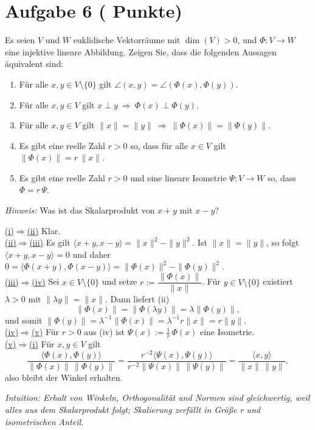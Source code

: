 \documentclass[11pt, a4paper]{article}
\newcommand{\aufgabe}[2]{%
  \section*{\Large\bfseries Aufgabe #1%
  \if\relax\detokenize{#2}\relax\else \hfill\normalfont\normalsize(#2 Punkte)\fi}%
  \vspace{-1.5ex}
}
\begin{document}
\aufgabe{6}{}
Es seien $V$ und $W$ euklidische Vektorräume mit $\dim(V)>0$, und $\Phi:V\to W$ eine injektive lineare Abbildung. Zeigen Sie, dass die folgenden Aussagen äquivalent sind:
\begin{enumerate}
  \item Für alle $x,y\in V\setminus\{0\}$ gilt $\angle(x,y)=\angle(\Phi(x),\Phi(y))$.
  \item Für alle $x,y\in V$ gilt $x\perp y\ \Rightarrow\ \Phi(x)\perp \Phi(y)$.
  \item Für alle $x,y\in V$ gilt $\|x\|=\|y\|\ \Rightarrow\ \|\Phi(x)\|=\|\Phi(y)\|$.
  \item Es gibt eine reelle Zahl $r>0$ so, dass für alle $x\in V$ gilt $\|\Phi(x)\|=r\,\|x\|$.
  \item Es gibt eine reelle Zahl $r>0$ und eine lineare Isometrie $\Psi:V\to W$ so, dass $\Phi=r\,\Psi$.
\end{enumerate}
\emph{Hinweis:} Was ist das Skalarprodukt von $x+y$ mit $x-y$?
\begin{framed}


\underline{(i)$\Rightarrow$(ii)} Klar. \\
\underline{(ii)$\Rightarrow$(iii)} Es gilt $\langle x+y,x-y\rangle=\|x\|^2-\|y\|^2$.
Ist $\|x\|=\|y\|$, so folgt $\langle x+y,x-y\rangle=0$ und daher
$0=\langle\Phi(x+y),\Phi(x-y)\rangle=\|\Phi(x)\|^2-\|\Phi(y)\|^2$. \\
\underline{(iii)$\Rightarrow$(iv)} Sei $x\in V\setminus\{0\}$ und setze
$r:=\dfrac{\|\Phi(x)\|}{\|x\|}$. Für $y\in V\setminus\{0\}$ existiert
$\lambda>0$ mit $\|\lambda y\|=\|x\|$. Dann liefert (ii)
\[
  \|\Phi(x)\|=\|\Phi(\lambda y)\|=\lambda\|\Phi(y)\|,
\]
und somit $\|\Phi(y)\|=\lambda^{-1}\|\Phi(x)\|=\lambda^{-1}r\|x\|
=r\|y\|$. \\
\underline{(iv)$\Rightarrow$(v)} Für $r>0$ aus (iv) ist
$\Psi(x):=\tfrac1r\,\Phi(x)$ eine Isometrie. \\
\underline{(v)$\Rightarrow$(i)} Für $x,y\in V$ gilt
\[
\frac{\langle \Phi(x),\Phi(y)\rangle}{\|\Phi(x)\|\,\|\Phi(y)\|}
=\frac{r^{-2}\langle \Psi(x),\Psi(y)\rangle}{r^{-2}\|\Psi(x)\|\,\|\Psi(y)\|}
=\frac{\langle x,y\rangle}{\|x\|\,\|y\|},
\]
also bleibt der Winkel erhalten.

\medskip\noindent\textit{Intuition: Erhalt von Winkeln, Orthogonalität und Normen sind gleichwertig, weil alles aus dem Skalarprodukt folgt; Skalierung zerfällt in Größe r und isometrischen Anteil.}
\end{framed}
\end{document}
